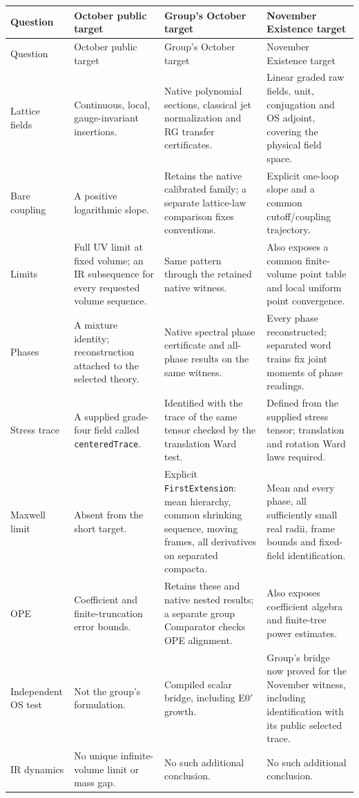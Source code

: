 \documentclass[11pt]{article}
\newcommand{\code}[1]{{\small\nolinkurl{#1}}}
\begin{document}
\begingroup\small\setlength{\tabcolsep}{4pt}
\renewcommand{\arraystretch}{1.15}
\begin{longtable}{@{}>{\raggedright\arraybackslash}p{}>{\raggedright\arraybackslash}p{}>{\raggedright\arraybackslash}p{}>{\raggedright\arraybackslash}p{}@{}}
\toprule
Question & October public target & Group's October target & November Existence target\\\midrule\endfirsthead
\toprule Question & October public target & Group's October target & November Existence target\\\midrule\endhead
Lattice fields & Continuous, local, gauge-invariant insertions. & Native polynomial sections, classical jet normalization and RG transfer certificates. & Linear graded raw fields, unit, conjugation and OS adjoint, covering the physical field space.\\
Bare coupling & A positive logarithmic slope. & Retains the native calibrated family; a separate lattice-law comparison fixes conventions. & Explicit one-loop slope and a common cutoff/coupling trajectory.\\
Limits & Full UV limit at fixed volume; an IR subsequence for every requested volume sequence. & Same pattern through the retained native witness. & Also exposes a common finite-volume point table and local uniform point convergence.\\
Phases & A mixture identity; reconstruction attached to the selected theory. & Native spectral phase certificate and all-phase results on the same witness. & Every phase reconstructed; separated word trains fix joint moments of phase readings.\\
Stress trace & A supplied grade-four field called \code{centeredTrace}. & Identified with the trace of the same tensor checked by the translation Ward test. & Defined from the supplied stress tensor; translation and rotation Ward laws required.\\
Maxwell limit & Absent from the short target. & Explicit \code{FirstExtension}: mean hierarchy, common shrinking sequence, moving frames, all derivatives on separated compacta. & Mean and every phase, all sufficiently small real radii, frame bounds and fixed-field identification.\\
OPE & Coefficient and finite-truncation error bounds. & Retains these and native nested results; a separate group Comparator checks OPE alignment. & Also exposes coefficient algebra and finite-tree power estimates.\\
Independent OS test & Not the group's formulation. & Compiled scalar bridge, including E0$'$ growth. & Group's bridge now proved for the November witness, including identification with its public selected trace.\\
IR dynamics & No unique infinite-volume limit or mass gap. & No such additional conclusion. & No such additional conclusion.\\
\bottomrule
\end{longtable}\endgroup
\end{document}
